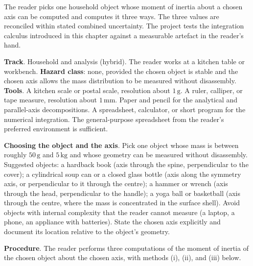 \begin{project}
The reader picks one household object whose moment of inertia about
a chosen axis can be computed and computes it three ways. The three
values are reconciled within stated combined uncertainty. The
project tests the integration calculus introduced in this chapter
against a measurable artefact in the reader's hand.

\textbf{Track}. Household and analysis (hybrid). The reader works
at a kitchen table or workbench. \textbf{Hazard class}: none,
provided the chosen object is stable and the chosen axis allows the
mass distribution to be measured without disassembly. \textbf{Tools}.
A kitchen scale or postal scale, resolution about $1\,\si{\gram}$.
A ruler, calliper, or tape measure, resolution about
$1\,\si{\milli\meter}$. Paper and pencil for the analytical and
parallel-axis decompositions. A spreadsheet, calculator, or short
program for the numerical integration. The general-purpose
spreadsheet from the reader's preferred environment is sufficient.

\textbf{Choosing the object and the axis}. Pick one object whose
mass is between roughly $50\,\si{\gram}$ and $5\,\si{\kilogram}$
and whose geometry can be measured without disassembly. Suggested
objects: a hardback book (axis through the spine, perpendicular to
the cover); a cylindrical soup can or a closed glass bottle (axis
along the symmetry axis, or perpendicular to it through the
centre); a hammer or wrench (axis through the head, perpendicular
to the handle); a yoga ball or basketball (axis through the centre,
where the mass is concentrated in the surface shell). Avoid objects
with internal complexity that the reader cannot measure (a laptop,
a phone, an appliance with batteries). State the chosen axis
explicitly and document its location relative to the object's
geometry.

\textbf{Procedure}. The reader performs three computations of the
moment of inertia of the chosen object about the chosen axis, with
methods (i), (ii), and (iii) below.


\end{project}
